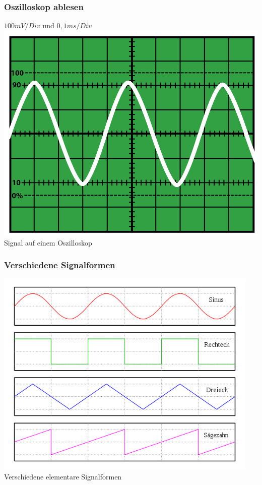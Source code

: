 \begin{frame}
  \frametitle{Oszilloskop ablesen}
  \begin{center}
    $100mV / Div$ und $0,1ms / Div$\\
    \includegraphics[width=.8\textwidth,height=.7\textheight,keepaspectratio]{a16/OsziTon.png}\\
    {\tiny Signal auf einem Oszilloskop \href{refs}{\cite{wmde}}}
  \end{center}
\end{frame}

\begin{frame}
  \frametitle{Verschiedene Signalformen}
  \begin{center}
    \includegraphics[width=0.95\textwidth,height=.8\textheight,keepaspectratio]{a16/Signalformen.png}\\
    {\tiny Verschiedene elementare Signalformen \href{refs}{\cite{wmen}}}
  \end{center}
\end{frame}

